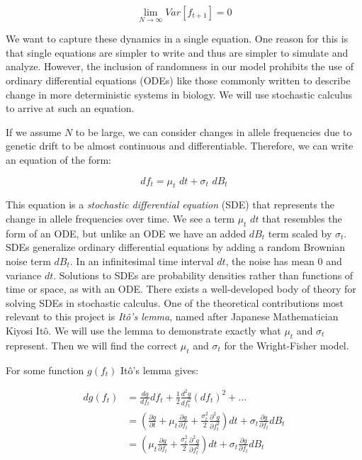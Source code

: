 \begin{equation}
    \lim_{N \to \infty} Var[f_{t+1}] = 0
\end{equation}

We want to capture these dynamics in a single equation. One reason for this is that single equations are simpler to write and thus are simpler to simulate and analyze. However, the inclusion of randomness in our model prohibits the use of ordinary differential equations (ODEs) like those commonly written to describe change in more deterministic systems in biology. We will use stochastic calculus to arrive at such an equation.


If we assume $N$ to be large, we can consider changes in allele frequencies due to genetic drift to be almost continuous and differentiable. Therefore, we can write an equation of the form: 

\begin{equation}
    df_t = \mu_t \, \,dt + \sigma_t \, \,dB_t
\end{equation}


This equation is a \textit{stochastic differential equation} (SDE) that represents the change in allele frequencies over time. We see a term $\mu_t \, \, dt$ that resembles the form of an ODE, but unlike an ODE we have an added $dB_t$ term scaled by $\sigma_t$. SDEs generalize ordinary differential equations by adding a random Brownian noise term $dB_{t}$. In an infinitesimal time interval $dt$, the noise has mean $0$ and variance $dt$. Solutions to SDEs are probability densities rather than functions of time or space, as with an ODE. There exists a well-developed body of theory for solving SDEs in stochastic calculus. One of the theoretical contributions most relevant to this project is \textit{It\^{o}'s lemma}, named after Japanese Mathematician Kiyosi It\^{o}. \cite{ito_1944} We will use the lemma to demonstrate exactly what $\mu_t$ and $\sigma_t$ represent. Then we will find the correct $\mu_t$ and $\sigma_t$ for the Wright-Fisher model. 


For some function $g(f_t)$ It\^{o}'s lemma gives:

\begin{equation}
    \begin{split}
        dg(f_t) 
                &= \frac{dg}{df_t}df_t + \frac{1}{2} \frac{d^2g}{df_t^2}(df_t)^2 + ... \\
                &= (\frac{\partial g}{\partial t} + \mu_t \frac{\partial g}{\partial f_t} + \frac{\sigma_t^2}{2} \frac{\partial^2 g}{\partial f_t^2})dt + \sigma_t \frac{\partial g}{\partial f_t}dB_t \\
                &= (\mu_t \frac{\partial g}{\partial f_t} + \frac{\sigma_t^2}{2} \frac{\partial^2 g}{\partial f_t^2})dt + \sigma_t \frac{\partial g}{\partial f_t}dB_t \\
    \end{split}
\end{equation}


